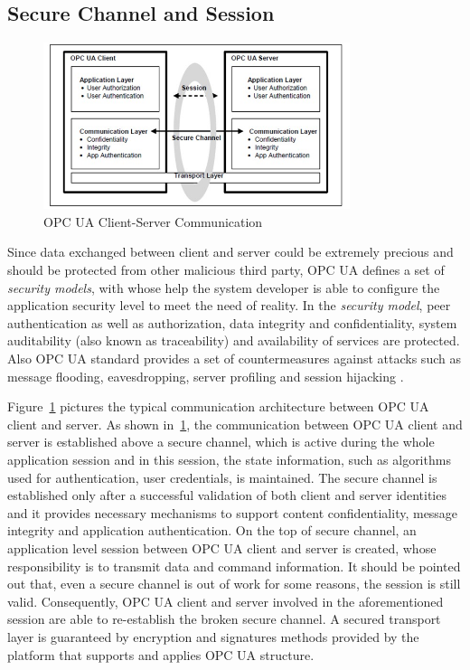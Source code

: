 \subsection{Secure Channel and Session}

\begin{figure}[!htbp]
	\centering
	\includegraphics[width=0.8\textwidth]{opc_ua_cs_comm.jpg}
		\caption{OPC UA Client-Server Communication \cite{O2}}
	\label{fig:opc_ua_cs_comm}
\end{figure}

Since data exchanged between client and server could be extremely precious and should be protected from other malicious third party, OPC UA defines a set of  \emph{security models}, with whose help the system developer is able to configure the application security level to meet the need of reality. In the \emph{security model},  peer authentication as well as authorization, data integrity and confidentiality, system auditability (also known as traceability) and availability of services are protected. Also OPC UA  standard provides a set of countermeasures against attacks such as message flooding, eavesdropping, server profiling and session hijacking \cite{O2}.


Figure~\ref{fig:opc_ua_cs_comm} pictures the typical communication architecture between OPC UA client and server. As shown in~\ref{fig:opc_ua_cs_comm}, the communication between OPC UA client and server is established above a secure channel, which is active during the whole application session and in this session, the state information, such as algorithms used for authentication, user credentials, is maintained. The secure channel is established only after a successful validation of both client and server identities and it provides necessary mechanisms to support content confidentiality, message integrity and application authentication. On the top of secure channel, an application level session between OPC UA client and server is created, whose responsibility is to transmit data and command information. It should be pointed out that, even a secure channel is out of work for some reasons, the session is still valid. Consequently, OPC UA client and server involved in the aforementioned session are able to re-establish the broken secure channel. A secured transport layer is guaranteed by encryption and signatures methods provided by the platform that supports and applies OPC UA structure.

